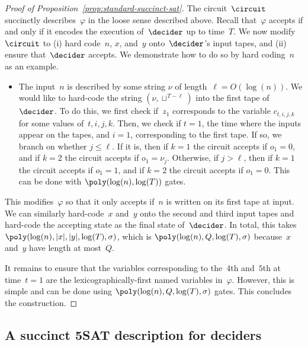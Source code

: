 \begin{proof}[Proof of Proposition~\ref{prop:standard-succinct-sat}]
The circuit~$\circuit$ succinctly describes~$\varphi$ in the loose sense
described above.
Recall that~$\varphi$ accepts if and only if it encodes the execution
of~$\decider$ up to time~$T$.
We now modify~$\circuit$ to (i) hard code~$n$, $x$, and~$y$ onto~$\decider$'s
input tapes, and (ii) ensure that~$\decider$ accepts.
We demonstrate how to do so by hard coding~$n$ as an example.
\begin{itemize}
\item The input~$n$ is described by some string $\nu$ of length~$\ell =
  O(\log(n))$.
	We would like to hard-code the string $(\nu, \sqcup^{T - \ell})$ into the
  first tape of~$\decider$.
	To do this, we first check if~$z_1$ corresponds to the variable $c_{t, i, j,
    k}$ for some values of~$t, i, j, k$.
	Then, we check if $t = 1$, the time where the inputs appear on the tapes, and
  $i = 1$, corresponding to the first tape.
	If so, we branch on whether $j \leq \ell$.
	If it is, then if $k = 1$ the circuit accepts if $o_1 = 0$, and if $k = 2$ the
  circuit accepts if $o_1 = \nu_j$.
	Otherwise, if $j > \ell$, then if $k = 1$ the circuit accepts if $o_1 = 1$,
  and if $k = 2$ the circuit accepts if $o_1 = 0$.
	This can be done with $\poly(\log(n), \log(T))$ gates.
\end{itemize}
This modifies~$\varphi$ so that it only accepts if~$n$ is written on its first
tape at input.
We can similarly hard-code~$x$ and~$y$ onto the second and third input tapes and
hard-code the accepting state as the final state of~$\decider$.
In total, this takes $\poly(\log(n), |x|, |y|, \log(T), \sigma)$, which is
$\poly(\log(n), Q, \log(T), \sigma)$ because~$x$ and~$y$ have length at
most~$Q$.

It remains to ensure that the variables corresponding to the~$4$th and~$5$th at
time~$t = 1$ are the lexicographically-first named variables in~$\varphi$.
However, this is simple and can be done using $\poly(\log(n), Q, \log(T),
\sigma)$ gates.
This concludes the construction.
\end{proof}

\subsection{A succinct 5SAT description for deciders}
\label{sec:succinct-deciders}


